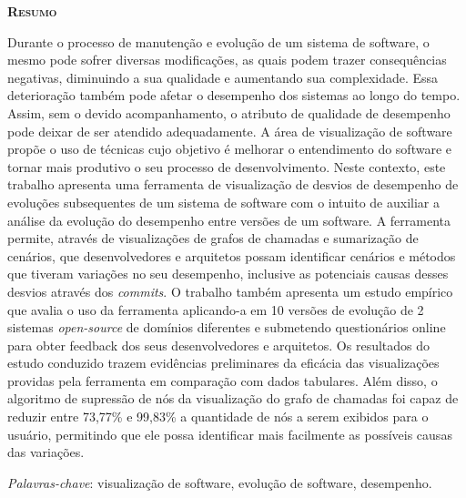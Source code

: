 \begin{center}
	{\Large{\textbf{\mscThesisTitle}}}
\end{center}

\vspace{1cm}


\vspace{1cm}

\begin{center}
	\Large{\textsc{\textbf{Resumo}}}
\end{center}

\noindent Durante o processo de manutenção e evolução de um sistema de software, o mesmo pode sofrer diversas modificações, as quais podem trazer consequências negativas, diminuindo a sua qualidade e aumentando sua complexidade. Essa deterioração também pode afetar o desempenho dos sistemas ao longo do tempo. Assim, sem o devido acompanhamento, o atributo de qualidade de desempenho pode deixar de ser atendido adequadamente. A área de visualização de software propõe o uso de técnicas cujo objetivo é melhorar o entendimento do software e tornar mais produtivo o seu processo de desenvolvimento. Neste contexto, este trabalho apresenta uma ferramenta de visualização de desvios de desempenho de evoluções subsequentes de um sistema de software com o intuito de auxiliar a análise da evolução do desempenho entre versões de um software. A ferramenta permite, através de visualizações de grafos de chamadas e sumarização de cenários, que desenvolvedores e arquitetos possam identificar cenários e métodos que tiveram variações no seu desempenho, inclusive as potenciais causas desses desvios através dos \textit{commits}. O trabalho também apresenta um estudo empírico que avalia o uso da ferramenta aplicando-a em 10 versões de evolução de 2 sistemas \textit{open-source} de domínios diferentes e submetendo questionários online para obter feedback dos seus desenvolvedores e arquitetos. Os resultados do estudo conduzido trazem evidências preliminares da eficácia das visualizações providas pela ferramenta em comparação com dados tabulares. Além disso, o algoritmo de supressão de nós da visualização do grafo de chamadas foi capaz de reduzir entre 73,77\% e 99,83\% a quantidade de nós a serem exibidos para o usuário, permitindo que ele possa identificar mais facilmente as possíveis causas das variações.

\noindent\textit{Palavras-chave}: visualização de software, evolução de software, desempenho.